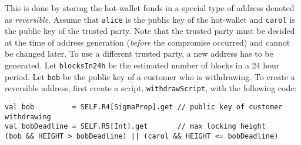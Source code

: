 \documentclass[11pt]{article}
\begin{document}
This is done by storing the hot-wallet funds in a special type of address denoted as {\em reversible}. Assume that \texttt{alice} is the public key of the hot-wallet and \texttt{carol} is the public key of the trusted party. Note that the trusted party must be decided at the time of address generation ({\em before} the compromise occurred) and cannot be changed later. To use a different trusted party, a new address has to be generated. Let \texttt{blocksIn24h} be the estimated number of blocks in a 24 hour period. 
Let \texttt{bob} be the public key of a customer who is withdrawing. 
To create a reversible address, first create a script, \texttt{withdrawScript}, with the following code:
\begin{verbatim}
val bob         = SELF.R4[SigmaProp].get // public key of customer withdrawing
val bobDeadline = SELF.R5[Int].get       // max locking height
(bob && HEIGHT > bobDeadline) || (carol && HEIGHT <= bobDeadline)
\end{verbatim}
\end{document}
